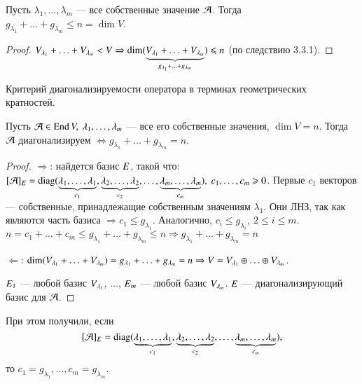 \documentclass[main]{subfiles}
\begin{document}
\begin{corollary}
    Пусть $\lambda_1, \ldots, \lambda_m$ — все собственные значение $\mathcal{A}$.
    Тогда $g_{\lambda_1} + \ldots + g_{\lambda_m} \le n = \dim V$.
\end{corollary}

\begin{proof}
    $V_{\lambda_1} + \ldots + V_{\lambda_m} < V
        \Rightarrow \dim (\underbrace{V_{\lambda_1} + \ldots + V_{\lambda_m}}_{g_{\lambda_1} + \ldots + g_{\lambda_m}}) \leqslant n$ (по следствию 3.3.1).
\end{proof}

\begin{proposition}
    Критерий диагонализируемости оператора в терминах геометрических кратностей.

    Пусть $\mathcal{A} \in \operatorname{End} V,\ \lambda_1, \ldots, \lambda_m$  — все его собственные значения,
    $\dim V = n$. Тогда $\mathcal{A}$  диагонализируем $\Leftrightarrow
        g_{\lambda_1} + \ldots +  g_{\lambda_m} = n$.
\end{proposition}

\begin{proof}
    $\Rightarrow$: найдется базис $E$, такой что:
    $[\mathcal{A}]_E = \operatorname{diag}(\underbrace{\lambda_1, \ldots, \lambda_1}_{c_1},
        \underbrace{\lambda_2, \ldots, \lambda_2}_{c_2}, \ldots,
        \underbrace{\lambda_m, \ldots, \lambda_m}_{c_m}), \  c_1, \ldots, c_m \geqslant 0$.
    Первые $c_1$  векторов  — собственные, принадлежащие собственным значениям
    $\lambda_1$. Они ЛНЗ, так как являются часть базиса $\Rightarrow c_1 \leq g_{\lambda_1}$.
    Аналогично, $c_i \leq g_{\lambda_i},\ 2 \leq i \leq m$.
    $n = c_1 + \ldots + c_m \leq g_{\lambda_1} + \ldots + g_{\lambda_m} \leq n
        \Rightarrow g_{\lambda_1} + \ldots + g_{\lambda_m} = n$

    $\Leftarrow$: $\dim (V_{\lambda_1} + \ldots + V_{\lambda_m}) =
        g_{\lambda_1} + \ldots + g_{\lambda_m} = n \Rightarrow
        V = V_{\lambda_1} \oplus \ldots \oplus  V_{\lambda_m}$.

    $E_1$  — любой базис $V_{\lambda_1}$, $\ldots$,
    $E_m$  — любой базис $V_{\lambda_m}$.
    $E$  — диагонализирующий базис для $\mathcal{A}$.
\end{proof}

\begin{remark}
    При этом получили, если
    \[[\mathcal{A}]_E = \operatorname{diag}(\underbrace{\lambda_1, \ldots, \lambda_1}_{c_1},
        \underbrace{\lambda_2, \ldots, \lambda_2}_{c_2}, \ldots,
        \underbrace{\lambda_m, \ldots, \lambda_m}_{c_m}),\]
    то $c_1 = g_{\lambda_1}, \ldots,c_m = g_{\lambda_m}$.
\end{remark}
\end{document}
